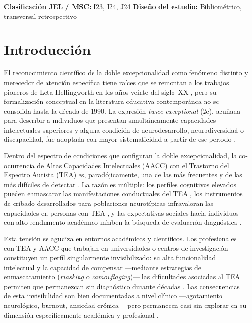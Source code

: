 \documentclass[12pt, a4paper]{article}
\begin{document}
\vspace{0.5cm}
\noindent\textbf{Clasificación JEL / MSC:} I23, I24, J24 \quad
\textbf{Diseño del estudio:} Bibliométrico, transversal retrospectivo

\newpage
\tableofcontents
\newpage

\section{Introducción}
\label{sec:intro}

El reconocimiento científico de la doble excepcionalidad como fenómeno distinto y
merecedor de atención específica tiene raíces que se remontan a los trabajos pioneros
de Leta Hollingworth en los años veinte del siglo~XX \parencite{hollingworth1923},
pero su formalización conceptual en la literatura educativa contemporánea no se
consolida hasta la década de 1990. La expresión \textit{twice-exceptional} (2e),
acuñada para describir a individuos que presentan simultáneamente capacidades
intelectuales superiores y alguna condición de neurodesarrollo, neurodiversidad o
discapacidad, fue adoptada con mayor sistematicidad a partir de ese período
\parencite{baum2004}.

Dentro del espectro de condiciones que configuran la doble excepcionalidad, la
co-ocurrencia de Altas Capacidades Intelectuales (AACC) con el Trastorno del Espectro
Autista (TEA) es, paradójicamente, una de las más frecuentes y de las más difíciles
de detectar \parencite{foleynicpon2011}. La razón es múltiple: los perfiles cognitivos
elevados pueden enmascarar las manifestaciones conductuales del TEA \parencite{boschi2016},
los instrumentos de cribado desarrollados para poblaciones neurotípicas infravaloran
las capacidades en personas con TEA \parencite{assouline2012}, y las expectativas
sociales hacia individuos con alto rendimiento académico inhiben la búsqueda de
evaluación diagnóstica \parencite{gelbar2022}.

Esta tensión se agudiza en entornos académicos y científicos. Los profesionales con
TEA y AACC que trabajan en universidades o centros de investigación constituyen un
perfil singularmente invisibilizado: su alta funcionalidad intelectual y la capacidad
de compensar —mediante estrategias de enmascaramiento (\textit{masking} o
\textit{camouflaging})— las dificultades asociadas al TEA permiten que permanezcan
sin diagnóstico durante décadas \parencite{mandy2019}. Las consecuencias de esta
invisibilidad son bien documentadas a nivel clínico —agotamiento neurológico,
burnout, ansiedad crónica— pero permanecen casi sin explorar en su dimensión
específicamente académica y profesional \parencite{price2022}.
\end{document}
